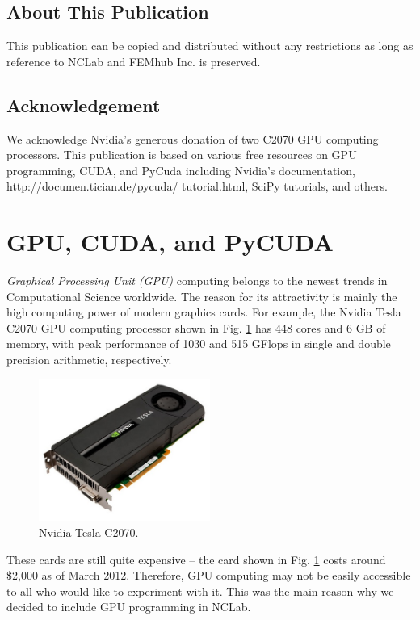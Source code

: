 \documentclass[article,A4,12pt]{llncs}
\begin{document}
\subsection*{About This Publication}
This publication can be copied and distributed without any restrictions
as long as reference to NCLab and FEMhub Inc. is preserved.

\subsection*{Acknowledgement}
We acknowledge Nvidia's generous donation of two C2070 GPU computing processors.
This publication is based on various free resources on GPU programming,
CUDA, and PyCuda including Nvidia's documentation, http://documen.tician.de/pycuda/ tutorial.html,
SciPy tutorials, and others.  

\normalsize

\newpage
\setcounter{tocdepth}{2}
\tableofcontents

\newpage

\pagestyle{plain}
\setcounter{page}{1}


\section{GPU, CUDA, and PyCUDA}

{\em Graphical Processing Unit (GPU)} computing belongs to the newest trends in
Computational Science worldwide. The reason for its attractivity is mainly 
the high computing power of modern graphics cards. For example, the 
Nvidia Tesla C2070 GPU computing processor shown in Fig. \ref{fig:tesla} 
has 448 cores and 6 GB of memory, with peak performance of 1030 and 515 
GFlops in single and double precision arithmetic, respectively.


\begin{figure}
\begin{center}
\includegraphics[width=0.5\textwidth]{img/tesla.png}
\caption{Nvidia Tesla C2070.}
\label{fig:tesla}
\end{center}
\end{figure}
\noindent
These cards are still quite expensive -- the card shown in Fig. \ref{fig:tesla} costs 
around \$2,000 as of March 2012. Therefore, GPU computing may not be easily accessible 
to all who would like to experiment with it. This was the main reason why we decided to 
include GPU programming in NCLab. 
\end{document}

